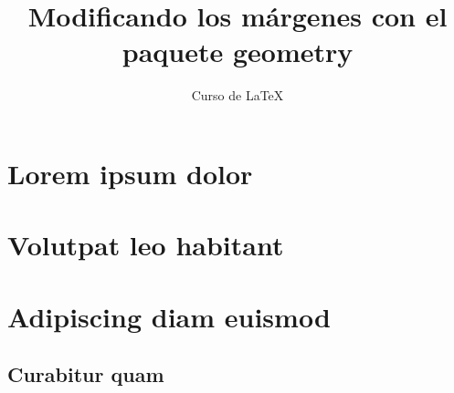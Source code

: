 \documentclass[12pt,letterpaper]{book}
\author{Curso de LaTeX}
\title{Modificando los márgenes con el paquete geometry}
\begin{document}
\frontmatter
\maketitle
\chapter{Lorem ipsum dolor}
\lipsum
\tableofcontents
\mainmatter
 \chapter{Volutpat leo habitant}
\lipsum
 \chapter{Adipiscing diam euismod}
\lipsum[1]
 \section{Curabitur quam}
\lipsum[2]
\end{document}
